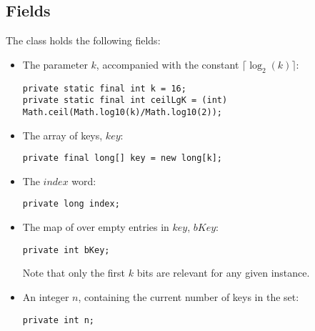 \subsection{Fields} \label{sec:binaryRankFields}
The class holds the following fields:
\begin{itemize}
    \item
    The parameter $k$, accompanied with the constant $\lceil \log_2(k) \rceil$:
    \begin{lstlisting}
private static final int k = 16;
private static final int ceilLgK = (int) Math.ceil(Math.log10(k)/Math.log10(2));
    \end{lstlisting}

    \item
    The array of keys, $key$:
    \begin{lstlisting}
private final long[] key = new long[k];
    \end{lstlisting}
    
    \item
    The $index$ word:
    \begin{lstlisting}
private long index;
    \end{lstlisting}

    \item
    The map of over empty entries in $key$, $bKey$:
    \begin{lstlisting}
private int bKey;
    \end{lstlisting}
    Note that only the first $k$ bits are relevant for any given instance.
    
    \item
    An integer $n$, containing the current number of keys in the set:
    \begin{lstlisting}
private int n;
    \end{lstlisting}
\end{itemize}

